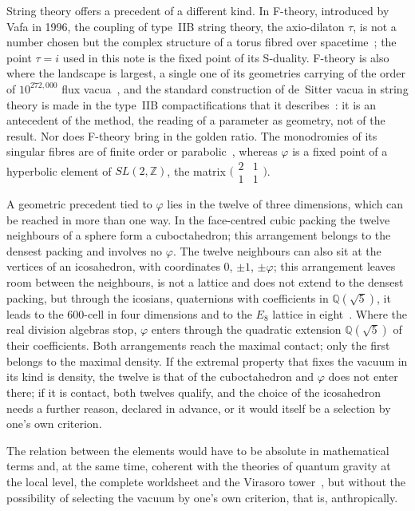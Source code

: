 \documentclass[11pt,reqno]{amsart}
\newcommand{\golden}{\varphi}
\numberwithin{equation}{section}
\theoremstyle{remark}
\begin{document}
String theory offers a precedent of a different kind. In F-theory, introduced by Vafa in 1996, the
coupling of type~IIB string theory, the axio-dilaton $\tau$, is not a number chosen but the complex
structure of a torus fibred over spacetime~\cite{Vaf96}; the point $\tau=i$ used in this note is the
fixed point of its S-duality. F-theory is also where the landscape is largest, a single one of its
geometries carrying of the order of $10^{272{,}000}$ flux vacua~\cite{TW15}, and the standard
construction of de~Sitter vacua in string theory is made in the type~IIB compactifications that it
describes~\cite{KKLT03}: it is an antecedent of the method, the reading of a parameter as geometry, not
of the result. Nor does F-theory bring in the golden ratio. The monodromies of its singular fibres are
of finite order or parabolic~\cite{Kod63}, whereas $\golden$ is a fixed point of a hyperbolic element of
$SL(2,\mathbb Z)$, the matrix $\bigl(\begin{smallmatrix}2&1\\1&1\end{smallmatrix}\bigr)$.

A geometric precedent tied to $\golden$ lies in the twelve of three dimensions, which can be reached in
more than one way. In the face-centred cubic packing the twelve neighbours of a sphere form a
cuboctahedron; this arrangement belongs to the densest packing and involves no $\golden$. The twelve
neighbours can also sit at the vertices of an icosahedron, with coordinates $0$, $\pm1$, $\pm\golden$;
this arrangement leaves room between the neighbours, is not a lattice and does not extend to the
densest packing, but through the icosians, quaternions with coefficients in $\mathbb Q(\sqrt5)$, it
leads to the $600$-cell in four dimensions and to the $E_8$ lattice in eight~\cite{Bae18}. Where the
real division algebras stop, $\golden$ enters through the quadratic extension $\mathbb Q(\sqrt5)$ of
their coefficients. Both arrangements reach the maximal contact; only the first belongs to the maximal
density. If the extremal property that fixes the vacuum in its kind is density, the twelve is that of
the cuboctahedron and $\golden$ does not enter there; if it is contact, both twelves qualify, and the
choice of the icosahedron needs a further reason, declared in advance, or it would itself be a
selection by one's own criterion.

The relation between the elements would have to be absolute in mathematical terms and, at the same
time, coherent with the theories of quantum gravity at the local level, the complete worldsheet and
the Virasoro tower~\cite{Vir70}, but without the possibility of selecting the vacuum by one's own
criterion, that is, anthropically.
\end{document}
